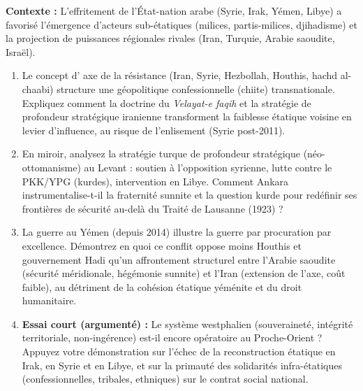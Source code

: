 \documentclass[11pt]{article}
\begin{document}
\begin{exercice}
\textbf{Contexte :} L'effritement de l'État-nation arabe (Syrie, Irak, Yémen, Libye) a favorisé l'émergence d'acteurs sub-étatiques (milices, partis-milices, djihadisme) et la projection de puissances régionales rivales (Iran, Turquie, Arabie saoudite, Israël).

\begin{enumerate}
    \item Le concept d' \og axe de la résistance \fg{} (Iran, Syrie, Hezbollah, Houthis, hachd al-chaabi) structure une géopolitique confessionnelle (chiite) transnationale. Expliquez comment la doctrine du \textit{Velayat-e faqih} et la stratégie de \og profondeur stratégique \fg{} iranienne transforment la faiblesse étatique voisine en levier d'influence, au risque de l'enlisement (Syrie post-2011).
    \item En miroir, analysez la stratégie turque de \og profondeur stratégique \fg{} (néo-ottomanisme) au Levant : soutien à l'opposition syrienne, lutte contre le PKK/YPG (kurdes), intervention en Libye. Comment Ankara instrumentalise-t-il la fraternité sunnite et la question kurde pour redéfinir ses frontières de sécurité au-delà du Traité de Lausanne (1923) ?
    \item La guerre au Yémen (depuis 2014) illustre la \og guerre par procuration \fg{} par excellence. Démontrez en quoi ce conflit oppose moins Houthis et gouvernement Hadi qu'un affrontement structurel entre l'Arabie saoudite (sécurité méridionale, hégémonie sunnite) et l'Iran (extension de l'axe, coût faible), au détriment de la cohésion étatique yéménite et du droit humanitaire.
    \item \textbf{Essai court (argumenté) :} \og Le système westphalien (souveraineté, intégrité territoriale, non-ingérence) est-il encore opératoire au Proche-Orient ? \fg{} Appuyez votre démonstration sur l'échec de la reconstruction étatique en Irak, en Syrie et en Libye, et sur la primauté des solidarités infra-étatiques (confessionnelles, tribales, ethniques) sur le contrat social national.
\end{enumerate}
\end{exercice}
\end{document}
